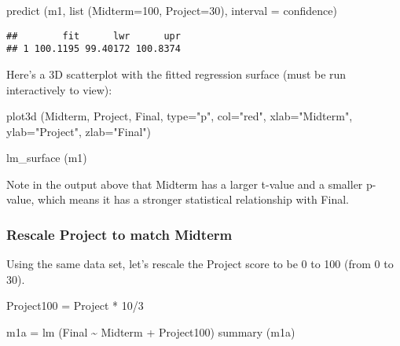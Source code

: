 \documentclass[
]{article}
\newenvironment{Shaded}{\begin{snugshade}}{\end{snugshade}}
\newcommand{\AttributeTok}[1]{\textcolor[rgb]{0.77,0.63,0.00}{#1}}
\newcommand{\DecValTok}[1]{\textcolor[rgb]{0.00,0.00,0.81}{#1}}
\newcommand{\FunctionTok}[1]{\textcolor[rgb]{0.00,0.00,0.00}{#1}}
\newcommand{\NormalTok}[1]{#1}
\newcommand{\OtherTok}[1]{\textcolor[rgb]{0.56,0.35,0.01}{#1}}
\newcommand{\SpecialCharTok}[1]{\textcolor[rgb]{0.00,0.00,0.00}{#1}}
\newcommand{\StringTok}[1]{\textcolor[rgb]{0.31,0.60,0.02}{#1}}
\begin{document}
\begin{Shaded}
\begin{Highlighting}[]
\FunctionTok{predict}\NormalTok{ (m1, }\FunctionTok{list}\NormalTok{ (}\AttributeTok{Midterm=}\DecValTok{100}\NormalTok{, }\AttributeTok{Project=}\DecValTok{30}\NormalTok{), }\AttributeTok{interval =} \StringTok{\textquotesingle{}confidence\textquotesingle{}}\NormalTok{)}
\end{Highlighting}
\end{Shaded}

\begin{verbatim}
##        fit      lwr      upr
## 1 100.1195 99.40172 100.8374
\end{verbatim}

Here's a 3D scatterplot with the fitted regression surface (must be run
interactively to view):

\begin{Shaded}
\begin{Highlighting}[]
\FunctionTok{plot3d}\NormalTok{ (Midterm, Project, Final, }\AttributeTok{type=}\StringTok{"p"}\NormalTok{, }\AttributeTok{col=}\StringTok{"red"}\NormalTok{, }
        \AttributeTok{xlab=}\StringTok{"Midterm"}\NormalTok{, }\AttributeTok{ylab=}\StringTok{"Project"}\NormalTok{, }\AttributeTok{zlab=}\StringTok{"Final"}\NormalTok{)}

\FunctionTok{lm\_surface}\NormalTok{ (m1)}
\end{Highlighting}
\end{Shaded}

Note in the output above that Midterm has a larger t-value and a smaller
p-value, which means it has a stronger statistical relationship with
Final.

\hypertarget{rescale-project-to-match-midterm}{%
\subsubsection{Rescale Project to match
Midterm}\label{rescale-project-to-match-midterm}}

Using the same data set, let's rescale the Project score to be 0 to 100
(from 0 to 30).

\begin{Shaded}
\begin{Highlighting}[]
\NormalTok{Project100 }\OtherTok{=}\NormalTok{ Project }\SpecialCharTok{*} \DecValTok{10}\SpecialCharTok{/}\DecValTok{3}

\NormalTok{m1a }\OtherTok{=} \FunctionTok{lm}\NormalTok{ (Final }\SpecialCharTok{\textasciitilde{}}\NormalTok{ Midterm }\SpecialCharTok{+}\NormalTok{ Project100)}
\FunctionTok{summary}\NormalTok{ (m1a)}
\end{Highlighting}
\end{Shaded}
\end{document}
